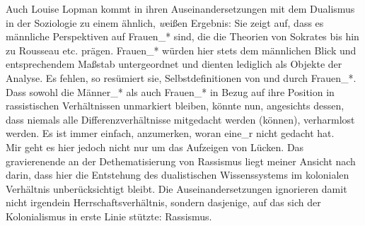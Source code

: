 Auch Louise Lopman kommt in
ihren Auseinandersetzungen mit dem Dualismus in der Soziologie zu einem
ähnlich, \textit{w}eißen Ergebnis: Sie zeigt auf, dass es männliche Perspektiven auf
Frauen\_* sind, die die Theorien von Sokrates bis hin zu Rousseau etc. prägen.
Frauen\_* würden hier stets dem männlichen Blick und entsprechendem Maßstab
untergeordnet und dienten lediglich als Objekte der Analyse. Es fehlen, so
resümiert sie, Selbstdefinitionen von und durch Frauen\_*.\footnotemark
{} \\
Dass sowohl die
Männer\_* als auch Frauen\_* in Bezug auf ihre Position in rassistischen
Verhältnissen unmarkiert bleiben, könnte nun, angesichts dessen, dass niemals
alle Differenzverhältnisse mitgedacht werden (können), verharmlost werden. Es
ist immer einfach, anzumerken, woran eine\_r nicht gedacht hat.\\

\noindent Mir geht es hier jedoch nicht nur um das Aufzeigen von Lücken. Das gravierenende an
der Dethematisierung von Rassismus liegt meiner Ansicht nach darin, dass hier
die Entstehung des dualistischen Wissenssystems im kolonialen Verhältnis
unberücksichtigt bleibt. Die Auseinandersetzungen ignorieren damit nicht
irgendein Herrschaftsverhältnis, sondern dasjenige, auf das sich der
Kolonialismus in erste Linie stützte: Rassismus.\\

